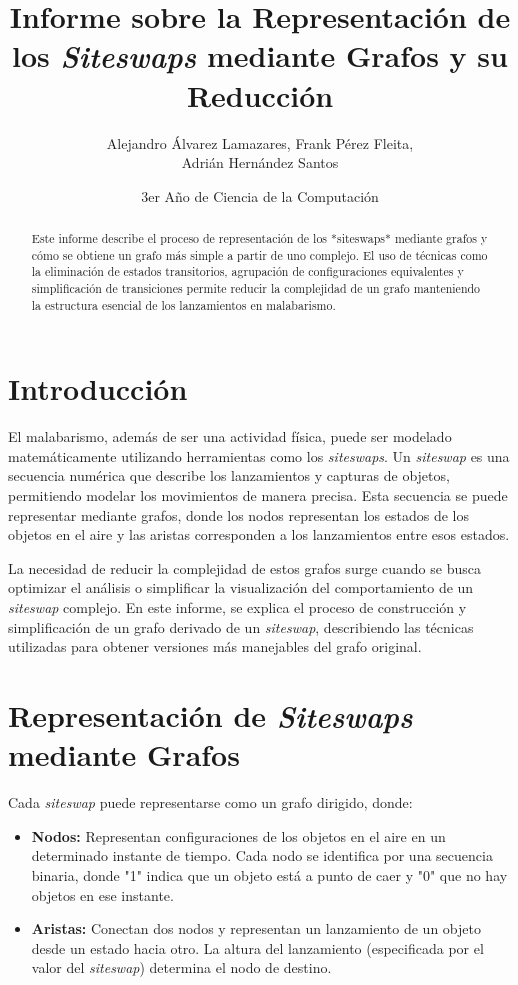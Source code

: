 \documentclass[a4paper,12pt]{article}
\title{Informe sobre la Representación de los \emph{Siteswaps} mediante Grafos y su Reducción}
\author{Alejandro Álvarez Lamazares, Frank Pérez Fleita,\\ Adrián Hernández Santos}
\date{3er Año de Ciencia de la Computación}
\begin{document}
\maketitle

\begin{abstract}
Este informe describe el proceso de representación de los *siteswaps* mediante grafos y cómo se obtiene un grafo más simple a partir de uno complejo. El uso de técnicas como la eliminación de estados transitorios, agrupación de configuraciones equivalentes y simplificación de transiciones permite reducir la complejidad de un grafo manteniendo la estructura esencial de los lanzamientos en malabarismo.
\end{abstract}

\section{Introducción}

El malabarismo, además de ser una actividad física, puede ser modelado matemáticamente utilizando herramientas como los \emph{siteswaps}. Un \emph{siteswap} es una secuencia numérica que describe los lanzamientos y capturas de objetos, permitiendo modelar los movimientos de manera precisa. Esta secuencia se puede representar mediante grafos, donde los nodos representan los estados de los objetos en el aire y las aristas corresponden a los lanzamientos entre esos estados.

La necesidad de reducir la complejidad de estos grafos surge cuando se busca optimizar el análisis o simplificar la visualización del comportamiento de un \emph{siteswap} complejo. En este informe, se explica el proceso de construcción y simplificación de un grafo derivado de un \emph{siteswap}, describiendo las técnicas utilizadas para obtener versiones más manejables del grafo original.

\section{Representación de \emph{Siteswaps} mediante Grafos}

Cada \emph{siteswap} puede representarse como un grafo dirigido, donde:

\begin{itemize}
    \item \textbf{Nodos:} Representan configuraciones de los objetos en el aire en un determinado instante de tiempo. Cada nodo se identifica por una secuencia binaria, donde "1" indica que un objeto está a punto de caer y "0" que no hay objetos en ese instante.
    \item \textbf{Aristas:} Conectan dos nodos y representan un lanzamiento de un objeto desde un estado hacia otro. La altura del lanzamiento (especificada por el valor del \emph{siteswap}) determina el nodo de destino.
\end{itemize}
\end{document}
